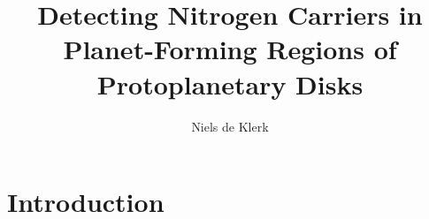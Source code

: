 \documentclass[twoside, single, authoryear, semicolon]{lion-msc}
\title{Detecting Nitrogen Carriers in Planet-Forming Regions of Protoplanetary Disks}
\author{Niels de Klerk}
\affiliation{Leiden Observatory, Universiteit Leiden}
\date{\displaydate{date}}
\newcommand{\4}{$_4$}
\newcommand{\3}{$_3$}
\newcommand{\2}{$_2$}
\begin{document}

\maketitle

\tableofcontents
\cleardoublepage
{}
\chapter{Introduction}


\end{document}
